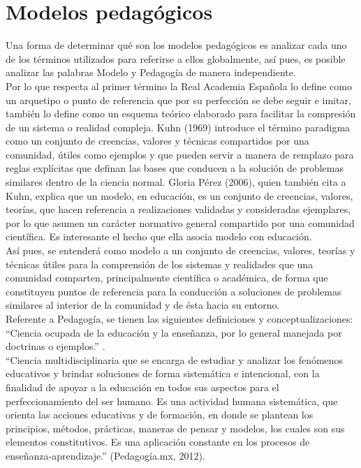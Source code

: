 \documentclass[12pt]{article} %
\begin{document}
\section{Modelos pedagógicos}
Una forma de determinar qué son los modelos pedagógicos es analizar cada uno de los términos utilizados para referirse a ellos globalmente, así pues, es posible analizar las palabras Modelo y Pedagogía de manera independiente.\\
Por lo que respecta al primer término la Real Academia Española \cite{RAE2012} lo define como un arquetipo o punto de referencia que por su perfección se debe seguir e imitar, también lo define como un esquema teórico elaborado para facilitar la compresión de un sistema o realidad compleja. Kuhn (1969) introduce el término paradigma como un conjunto de creencias, valores y técnicas compartidos por una comunidad, útiles como ejemplos y que pueden servir a manera de remplazo para reglas explícitas que definan las bases que conducen a la solución de problemas similares dentro de la ciencia normal. Gloria Pérez (2006), quien también cita a Kuhn, explica que un modelo, en educación, es un conjunto de creencias, valores, teorías, que hacen referencia a realizaciones validadas y consideradas ejemplares, por lo que asumen un carácter normativo general compartido por una comunidad científica. Es interesante el hecho que ella asocia modelo con educación.\\
Así pues, se entenderá como modelo a un conjunto de creencias, valores, teorías y técnicas útiles para la comprensión de los sistemas y realidades que una comunidad comparten, principalmente científica o académica, de forma que constituyen puntos de referencia para la conducción a soluciones de problemas similares al interior de la comunidad y de ésta hacia su entorno.\\
Referente a Pedagogía, se tienen las siguientes definiciones y conceptualizaciones:
“Ciencia ocupada de la educación y la enseñanza, por lo general manejada por doctrinas o ejemplos.” \cite{RAE2012}.\\
“Ciencia multidisciplinaria que se encarga de estudiar y analizar los fenómenos educativos y brindar soluciones de forma sistemática e intencional, con la finalidad de apoyar a la educación en todos sus aspectos para el perfeccionamiento del ser humano. Es una actividad humana sistemática, que orienta las acciones educativas y de formación, en donde se plantean los principios, métodos, prácticas, maneras de pensar y modelos, los cuales son sus elementos constitutivos. Es una aplicación constante en los procesos de enseñanza-aprendizaje.” (Pedagogía.mx, 2012).\\
\end{document}

